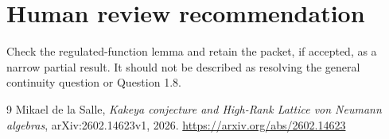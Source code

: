 \documentclass[11pt]{article}
\begin{document}
\section{Human review recommendation}

Check the regulated-function lemma and retain the packet, if accepted, as a
narrow partial result. It should not be described as resolving the general
continuity question or Question 1.8.

\begin{thebibliography}{9}
Mikael de la Salle,
\emph{Kakeya conjecture and High-Rank Lattice von Neumann algebras},
arXiv:2602.14623v1, 2026.
\url{https://arxiv.org/abs/2602.14623}
\end{thebibliography}
\end{document}
